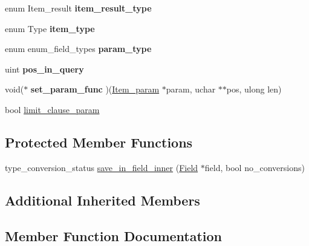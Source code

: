 \begin{DoxyCompactItemize}
\begin{tabbing}
\end{tabbing}\item 
\mbox{\label{classItem__param_a8f60ebab56623ee62b43db90e95addfd}} 
enum Item\+\_\+result {\bfseries item\+\_\+result\+\_\+type}
\item 
\mbox{\label{classItem__param_a4d42bac7df80acc1d7aae9919012bba5}} 
enum Type {\bfseries item\+\_\+type}
\item 
\mbox{\label{classItem__param_a148ad5c9257eb2f6e267a24e611034d9}} 
enum enum\+\_\+field\+\_\+types {\bfseries param\+\_\+type}
\item 
\mbox{\label{classItem__param_a4ce44960261d08fcb41980b2a82ef11f}} 
uint {\bfseries pos\+\_\+in\+\_\+query}
\item 
\mbox{\label{classItem__param_ab26a328afde488272ad39d425f327ba1}} 
void($\ast$ {\bfseries set\+\_\+param\+\_\+func} )(\mbox{\hyperlink{classItem__param}{Item\+\_\+param}} $\ast$param, uchar $\ast$$\ast$pos, ulong len)
\item 
bool \mbox{\hyperlink{classItem__param_af30c36946ecc0f2d54b89f03bac74cd4}{limit\+\_\+clause\+\_\+param}}
\end{DoxyCompactItemize}
\subsection*{Protected Member Functions}
\begin{DoxyCompactItemize}
\item 
type\+\_\+conversion\+\_\+status \mbox{\hyperlink{classItem__param_a06432323e21e8640436094b45a7c8cb1}{save\+\_\+in\+\_\+field\+\_\+inner}} (\mbox{\hyperlink{classField}{Field}} $\ast$field, bool no\+\_\+conversions)
\end{DoxyCompactItemize}
\subsection*{Additional Inherited Members}


\subsection{Member Function Documentation}
\mbox{\label{classItem__param_ac0dc1a35a837e189438c9db096b043d9}} 
